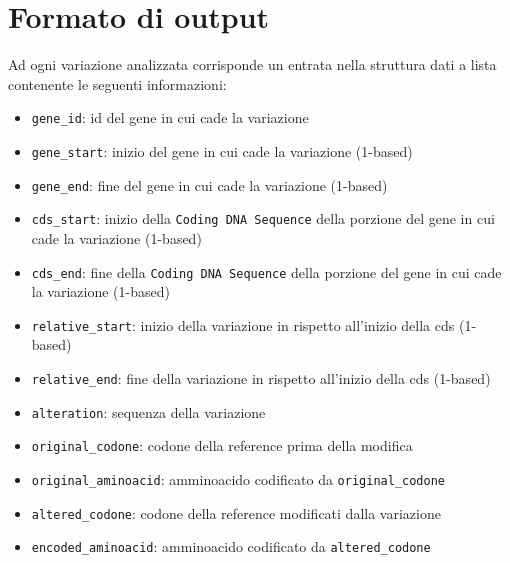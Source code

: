 \documentclass[11pt,italian]{article}
\begin{document}
\section{Formato di output}
Ad ogni variazione analizzata corrisponde un entrata nella struttura dati a lista contenente le seguenti informazioni:
\begin{itemize}
    \item \lstinline{gene_id}: id del gene in cui cade la variazione
    \item \lstinline{gene_start}: inizio del gene in cui cade la variazione (1-based)
    \item \lstinline{gene_end}: fine del gene in cui cade la variazione (1-based)
    \item \lstinline{cds_start}: inizio della \lstinline{Coding DNA Sequence} della porzione del gene in cui cade la variazione (1-based)
    \item \lstinline{cds_end}: fine della \lstinline{Coding DNA Sequence} della porzione del gene in cui cade la variazione (1-based)
    \item \lstinline{relative_start}: inizio della variazione in rispetto all'inizio della cds (1-based)
    \item \lstinline{relative_end}: fine della variazione in rispetto all'inizio della cds (1-based)
    \item \lstinline{alteration}: sequenza della variazione
    \item \lstinline{original_codone}: codone della reference prima della modifica
    \item \lstinline{original_aminoacid}: amminoacido codificato da \lstinline{original_codone}
    \item \lstinline{altered_codone}: codone della reference modificati dalla variazione
    \item \lstinline{encoded_aminoacid}: amminoacido codificato da \lstinline{altered_codone}
\end{itemize}
\end{document}
